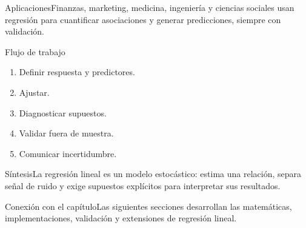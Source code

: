 \documentclass[10pt,aspectratio=169]{beamer}
\begin{document}
\begin{frame}{Aplicaciones}\small Finanzas, marketing, medicina, ingeniería y ciencias sociales usan regresión para cuantificar asociaciones y generar predicciones, siempre con validación.\end{frame}
\begin{frame}{Flujo de trabajo}\small\begin{enumerate}\item Definir respuesta y predictores.\item Ajustar.\item Diagnosticar supuestos.\item Validar fuera de muestra.\item Comunicar incertidumbre.\end{enumerate}\end{frame}
\begin{frame}{Síntesis}\small La regresión lineal es un modelo estocástico: estima una relación, separa señal de ruido y exige supuestos explícitos para interpretar sus resultados.\end{frame}
\begin{frame}{Conexión con el capítulo}\small Las siguientes secciones desarrollan las matemáticas, implementaciones, validación y extensiones de regresión lineal.\end{frame}
\end{document}
